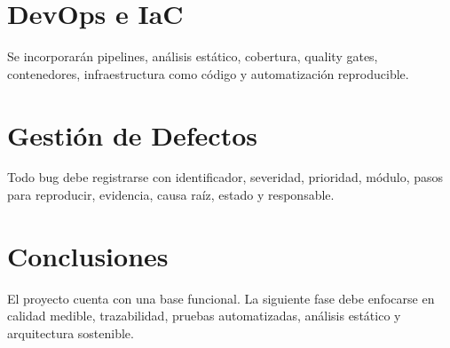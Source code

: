 ﻿\documentclass[12pt,letterpaper]{article}
\begin{document}
\section{DevOps e IaC}
Se incorporarán pipelines, análisis estático, cobertura, quality gates, contenedores, infraestructura como código y automatización reproducible.

\section{Gestión de Defectos}
Todo bug debe registrarse con identificador, severidad, prioridad, módulo, pasos para reproducir, evidencia, causa raíz, estado y responsable.

\section{Conclusiones}
El proyecto cuenta con una base funcional. La siguiente fase debe enfocarse en calidad medible, trazabilidad, pruebas automatizadas, análisis estático y arquitectura sostenible.
\end{document}
